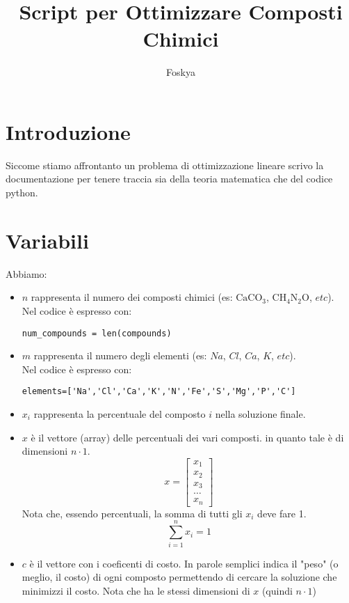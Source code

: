 \documentclass{article}
\title{Script per Ottimizzare Composti Chimici}
\author{Foskya}
\date{}
\begin{document}
\maketitle
\newpage
\tableofcontents
\newpage

\section{Introduzione}
Siccome stiamo affrontanto un problema di ottimizzazione lineare scrivo la documentazione per tenere traccia sia della teoria matematica che del codice python.

\section{Variabili}
Abbiamo:
\begin{itemize}
    \item $n$ rappresenta il numero dei composti chimici (es: $\text{CaCO}_3$, $\text{CH}_4\text{N}_2\text{O}$, $etc$).
    \\Nel codice è espresso con:
    \begin{lstlisting} 
num_compounds = len(compounds) 
    \end{lstlisting}
    \item $m$ rappresenta il numero degli elementi (es: $Na$, $Cl$, $Ca$, $K$, $etc$).
    \\Nel codice è espresso con:
    \begin{lstlisting} 
elements=['Na','Cl','Ca','K','N','Fe','S','Mg','P','C']
    \end{lstlisting}
    \item $x_i$ rappresenta la percentuale del composto $i$ nella soluzione finale.
    \item $x$ è il vettore (array) delle percentuali dei vari composti. in quanto tale è di dimensioni $n\cdot1$. 
        \[ x = \begin{bmatrix} x_1 \\ x_2 \\ x_3 \\ \ldots \\ x_n \end{bmatrix} \]
    Nota che, essendo percentuali, la somma di tutti gli $x_i$ deve fare 1.
        \[ \sum_{i=1}^{n} x_i = 1 \]
    \item $c$ è il vettore con i coeficenti di costo. In parole semplici indica il "peso" (o meglio, il costo) di ogni composto permettendo di cercare la soluzione che minimizzi il costo. Nota che ha le stessi dimensioni di $x$ (quindi $n\cdot1$)

\end{itemize}
\end{document}
